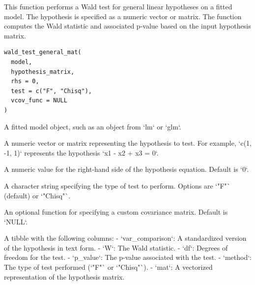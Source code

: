 \documentclass[a4paper]{book}
\begin{document}
%
\begin{Description}
This function performs a Wald test for general linear hypotheses on a fitted model.
The hypothesis is specified as a numeric vector or matrix. The function computes
the Wald statistic and associated p-value based on the input hypothesis matrix.
\end{Description}
%
\begin{Usage}
\begin{verbatim}
wald_test_general_mat(
  model,
  hypothesis_matrix,
  rhs = 0,
  test = c("F", "Chisq"),
  vcov_func = NULL
)
\end{verbatim}
\end{Usage}
%
\begin{Arguments}
\begin{ldescription}
\item[\code{model}] A fitted model object, such as an object from `lm` or `glm`.

\item[\code{hypothesis\_matrix}] A numeric vector or matrix representing the hypothesis to test.
For example, `c(1, -1, 1)` represents the hypothesis `x1 - x2 + x3 = 0`.

\item[\code{rhs}] A numeric value for the right-hand side of the hypothesis equation. Default is `0`.

\item[\code{test}] A character string specifying the type of test to perform. Options are `"F"`
(default) or `"Chisq"`.

\item[\code{vcov\_func}] An optional function for specifying a custom covariance matrix. Default is `NULL`.
\end{ldescription}
\end{Arguments}
%
\begin{Value}
A tibble with the following columns:
- `var\_comparison`: A standardized version of the hypothesis in text form.
- `W`: The Wald statistic.
- `df`: Degrees of freedom for the test.
- `p\_value`: The p-value associated with the test.
- `method`: The type of test performed (`"F"` or `"Chisq"`).
- `mat`: A vectorized representation of the hypothesis matrix.
\end{Value}
%
\end{document}
